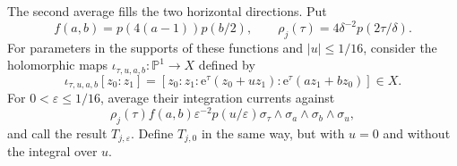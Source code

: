 The second average fills the two horizontal directions. Put
\[
 f(a,b)=p(4(a-1))p(b/2),\qquad
 \rho_j(\tau)=4\delta^{-2}p(2\tau/\delta).
\]
For parameters in the supports of these functions and $|u|\leq1/16$, consider the holomorphic maps $\iota_{\tau,u,a,b}\colon\mathbb P^1\to X$ defined by
\begin{equation}\label{eq:lower-mass-rational-curves}
 \iota_{\tau,u,a,b}[z_0:z_1]
 =[z_0:z_1:\mathrm{e}^{\tau}(z_0+uz_1):
                \mathrm{e}^{\tau}(az_1+bz_0)]\in X.
\end{equation}
For $0<\varepsilon\leq1/16$, average their integration currents against
\[
 \rho_j(\tau)f(a,b)\varepsilon^{-2}p(u/\varepsilon)
       \sigma_\tau\wedge\sigma_a\wedge\sigma_b\wedge\sigma_u,
\]
and call the result $T_{j,\varepsilon}$. Define $T_{j,0}$ in the same way, but with $u=0$ and without the integral over $u$.

